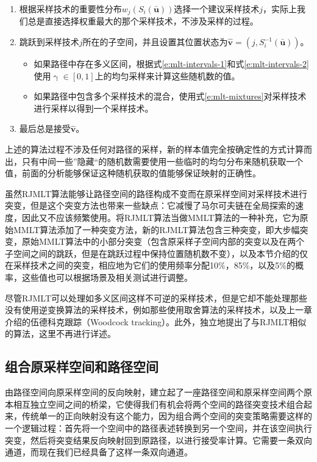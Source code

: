 \begin{enumerate}
	\item 根据采样技术的重要性分布$w_j(S_i(\bar{\mathbf{u}}))$选择一个建议采样技术$j$，实际上我们总是直接选择权重最大的那个采样技术，不涉及采样的过程。
	\item 跳跃到采样技术$j$所在的子空间，并且设置其位置状态为$\hat{\mathbf{v}}=(j,S^{-1}_i(\bar{\mathbf{u}}))$。
	\begin{itemize}
		\item 如果路径中存在多义区间，根据式\ref{e:mlt-intervals-1}和式\ref{e:mlt-intervals-2}使用$\upgamma\in[0,1]$上的均匀采样来计算这些随机数的值。
		\item 如果路径中包含多个采样技术的混合，使用式\ref{e:mlt-mixtures}对采样技术进行采样以得到一个采样技术。
	\end{itemize}
	
	\item 最后总是接受$\hat{\mathbf{v}}$。
\end{enumerate}

上述的算法过程不涉及任何对路径的采样，新的样本值完全按确定性的方式计算而出，只有中间一些”隐藏“的随机数需要使用一些临时的均匀分布来随机获取一个值，前面的分析能够保证这种随机获取的值能够保证映射的正确性。

虽然RJMLT算法能够让路径空间的路径构成不变而在原采样空间对采样技术进行突变，但是这个突变方法也带来一些缺点：它减慢了马尔可夫链在全局探索的速度，因此又不应该频繁使用。\cite{a:ReversibleJumpMetropolisLightTransportusingInverseMappings}将RJMLT算法当做MMLT算法的一种补充，它为原始MMLT算法添加了一种突变方法，新的RJMLT算法包含三种突变，即大步幅突变，原始MMLT算法中的小部分突变（包含原采样子空间内部的突变以及在两个子空间之间的跳跃，但是在跳跃过程中保持位置随机数不变），以及本节介绍的仅在采样技术之间的突变，相应地为它们的使用频率分配10\%，85\%，以及5\%的概率，这些值也可以根据场景及相关测试进行调整。

尽管RJMLT可以处理如多义区间这样不可逆的采样技术，但是它却不能处理那些没有使用逆变换算法的采样技术，例如那些使用取舍算法的采样技术，以及上一章介绍的伍德科克跟踪（Woodcock tracking）\cite{a:TechniquesusedintheGEMcodeforMonteCarloneu-tronicscalculationsinreactorsandothersystemsofcomplexgeometry}。此外，\cite{a:ChartedMetropolisLightTransport}独立地提出了与RJMLT相似的算法，这里不再进行详述。





\subsection{组合原采样空间和路径空间}
由路径空间向原采样空间的反向映射，建立起了一座路径空间和原采样空间两个原本相互独立空间之间的桥梁，它使得我们有机会将两个空间的路径突变技术组合起来，传统单一的正向映射没有这个能力，因为组合两个空间的突变策略需要这样的一个逻辑过程：首先将一个空间中的路径表述转换到另一个空间，并在该空间执行突变，然后将突变结果反向映射回到原路径，以进行接受率计算。它需要一条双向通道，而现在我们已经具备了这样一条双向通道。

